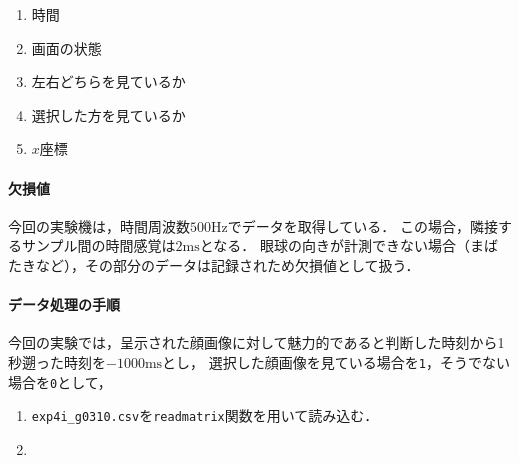 \begin{center}
\begin{framed}
\begin{minipage}[t]{.48\textwidth}
        \end{minipage}
        \begin{minipage}[t]{.26\textwidth}
            \begin{center}
                \expos
            \end{center}
            \begin{enumerate}
                \renewcommand{\labelenumi}{\theenumi 列目}
                \item 時間
                \item 画面の状態
                \item {\footnotesize 左右どちらを見ているか}
                \item {\footnotesize 選択した方を見ているか}
                \item \(x\)座標
            \end{enumerate}
        \end{minipage}
    \end{framed}
\end{center}
\paragraph{欠損値}
今回の実験機\elt は，時間周波数\(500\textrm{Hz}\)でデータを取得している．
この場合，隣接するサンプル間の時間感覚は\(2\textrm{ms}\)となる．
眼球の向きが計測できない場合（まばたきなど），その部分のデータは記録されため欠損値として扱う．
\paragraph{データ処理の手順}
今回の実験では，呈示された顔画像に対して魅力的であると判断した時刻から1秒遡った時刻を\(-1000\textrm{ms}\)とし，
選択した顔画像を見ている場合を\texttt{1}，そうでない場合を\texttt{0}として，
\begin{enumerate}
    \item \texttt{exp4i\_g0310.csv}を\texttt{readmatrix}関数を用いて読み込む．
    \item
\end{enumerate}